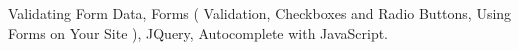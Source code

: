 \documentclass[11pt,a4paper]{moderncv}
\begin{document}
{            Validating Form Data,                                                                                 %
            Forms (                                                                                               %
                Validation,                                                                                       %
                Checkboxes and Radio Buttons,                                                                     %
                Using Forms on Your Site                                                                          %
                ),                                                                                                %
            JQuery,                                                                                               %
            Autocomplete with JavaScript.                                                                         %
    }
\end{document}
